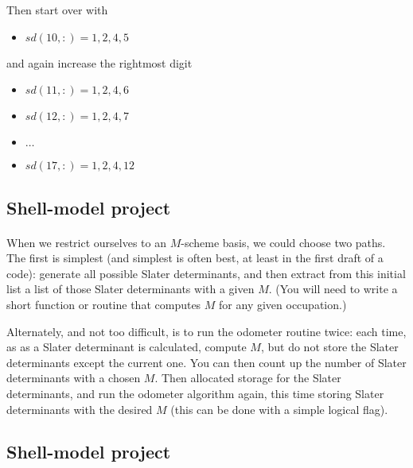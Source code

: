 \documentclass[%
oneside,                 %
final,                   %
10pt]{article}
\begin{document}
\noindent
Then start over with 
\begin{itemize}
\item $sd(10,:)= 1,2,4,5$
\end{itemize}

\noindent
and again increase the rightmost digit

\begin{itemize}
\item $sd(11,:)= 1,2,4,6$

\item $sd(12,:)= 1,2,4,7$

\item $\ldots$

\item $sd(17,:)= 1,2,4,12$
\end{itemize}

\noindent



\subsection*{Shell-model project}

\paragraph{}
When we restrict ourselves to an $M$-scheme basis, we could choose two paths. 
The first is simplest (and simplest is often best, at 
least in the first draft of a code): generate all possible Slater determinants, 
and then extract from this initial list a list of those Slater determinants with a given 
$M$. (You will need to write a short function or routine that computes $M$ for any 
given occupation.)  

Alternately, and not too difficult, is to run the odometer routine twice: each time, as 
as a Slater determinant is calculated, compute $M$, but do not store the Slater determinants 
except the current one. You can then count up the number of Slater determinants with a 
chosen $M$.  Then allocated storage for the Slater determinants, and run the odometer 
algorithm again, this time storing Slater determinants with the desired $M$ (this can be 
done with a simple logical flag).



\subsection*{Shell-model project}
\end{document}
